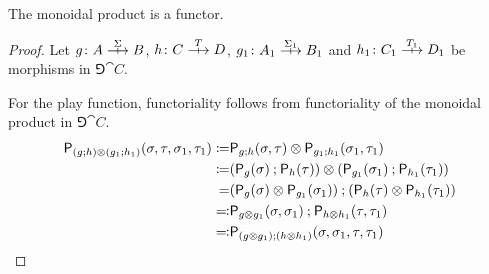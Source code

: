 \begin{lemma}
  The monoidal product is a functor.
\end{lemma}
\begin{proof}
  Let \(g \colon A \gamearrow{\Sigma} B\), \(h \colon C \gamearrow{T} D\), \(g_1 \colon A_1 \gamearrow{\Sigma_1} B_1\) and \(h_1 \colon C_1 \gamearrow{T_1} D_1\) be morphisms in \(\Game{\cat{C}}\).

For the play function, functoriality follows from functoriality of the monoidal product in \(\Game{\cat{C}}\).
\begin{align*} \play{(g \dcomp h) \tensor (g_1 \dcomp h_1)}(\sigma,\tau,\sigma_1,\tau_1) \defn & \play{g \dcomp h}(\sigma,\tau) \otimes \play{g_1 \dcomp h_1}(\sigma_1,\tau_1) \\
\defn & (\play{g}(\sigma) \dcomp \play{h}(\tau)) \otimes (\play{g_1}(\sigma_1) \dcomp \play{h_1}(\tau_1)) \\
=& (\play{g}(\sigma) \tensor \play{g_1}(\sigma_1)) \dcomp (\play{h}(\tau) \tensor \play{h_1}(\tau_1)) \\
\codefn& \play{g \tensor g_1}(\sigma,\sigma_1) \dcomp \play{h \tensor h_1}(\tau,\tau_1) \\
\codefn& \play{(g \tensor g_1) \dcomp (h \tensor h_1)}(\sigma,\sigma_1,\tau,\tau_1) \\
\end{align*}


\end{proof}
